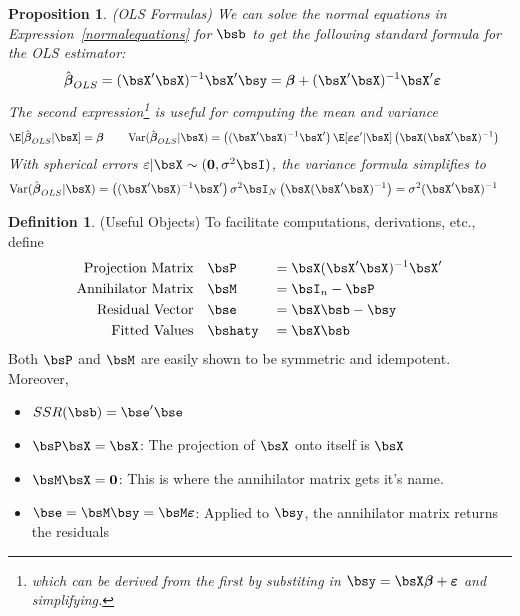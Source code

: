 \documentclass[12pt]{article}
\theoremstyle{plain}
\newtheorem{prop}[thm]{Proposition}
\theoremstyle{definition}
\newtheorem{defn}[thm]{Definition}
\theoremstyle{remark}
\newcommand{\bsvarepsilon}{\boldsymbol{\varepsilon}}
\newcommand{\bsbeta}{\boldsymbol{\beta}}
\renewcommand{\bso}{\boldsymbol{0}}
\newcommand{\Var}{\operatorname{Var}}
\begin{document}
\begin{prop}\emph{(OLS Formulas)}
\label{prop:olsformulas}
We can solve the normal equations in Expression~\ref{normalequations}
for $\bsb$ to get the following standard formula for the OLS estimator:
\begin{align}
  \hat{\bsbeta}_{OLS}
  &= (\bsX'\bsX)^{-1}\bsX'\bsy
  = \bsbeta + (\bsX'\bsX)^{-1}\bsX' \bsvarepsilon
  \label{eq:ols}
\end{align}
The second expression\footnote{%
  which can be derived from the first by substiting in
  $\bsy=\bsX\bsbeta+\bsvarepsilon$ and simplifying.
}
is useful for computing the mean and variance
\begin{align*}
  \E[\hat{\bsbeta}_{OLS}|\bsX]
  &= \bsbeta
  \qquad
  \Var(\hat{\bsbeta}_{OLS}|\bsX)
  =
  \left((\bsX'\bsX)^{-1}\bsX'\right)
  \E[\bsvarepsilon\bsvarepsilon' |\bsX]
  \left(\bsX(\bsX'\bsX)^{-1}\right)
\end{align*}
With spherical errors $\varepsilon|\bsX\sim (\bso,\sigma^2\bsI)$, the
variance formula simplifies to
\begin{align}
  \Var(\hat{\bsbeta}_{OLS}|\bsX)
  &=
  \left((\bsX'\bsX)^{-1}\bsX'\right)
  \sigma^2 \bsI_N
  \left(\bsX(\bsX'\bsX)^{-1}\right)
  =\sigma^2 (\bsX'\bsX)^{-1}
  \label{eq:olsvar}
\end{align}
\end{prop}

\begin{defn}(Useful Objects)
To facilitate computations, derivations, etc., define
\begin{alignat*}{3}
  \text{Projection Matrix}&\quad
  \bsP &&= \bsX(\bsX'\bsX)^{-1}\bsX' \\
  \text{Annihilator Matrix}&\quad
  \bsM &&= \bsI_n - \bsP \\
  \text{Residual Vector}&\quad
  \bse &&= \bsX\bsb - \bsy \\
  \text{Fitted Values}&\quad
  \bshaty &&= \bsX\bsb
\end{alignat*}
Both $\bsP$ and $\bsM$ are easily shown to be symmetric and idempotent.
Moreover,
\begin{itemize}
  \item $SSR(\bsb) = \bse'\bse$
  \item $\bsP\bsX=\bsX$: The projection of $\bsX$ onto itself is $\bsX$
  \item $\bsM\bsX = \bso$: This is where the annihilator matrix gets
    it's name.
  \item $\bse = \bsM\bsy = \bsM \bsvarepsilon$: Applied to $\bsy$, the
    annihilator matrix returns the residuals
\end{itemize}
\end{defn}
\end{document}
